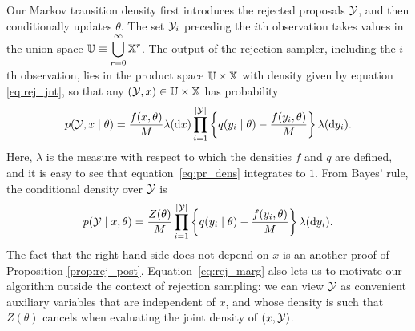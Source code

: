 Our Markov transition density first introduces the rejected proposals $\mathcal{Y}$, and then conditionally
updates $\theta$. The set $\mathcal{Y}_i$ preceding the $i$th observation takes values in the union space 
$\displaystyle \mathbb{U} \equiv \bigcup_{r=0}^{\infty} \mathbb{X}^r$. %
The output of the rejection sampler, including the $i$th observation, lies in the product space $\mathbb{U} \times \mathbb{X}$ with density given by equation \eqref{eq:rej_jnt},
so that any $(\mathcal{Y}, x) \in \mathbb{U} \times \mathbb{X}$ has probability
\begin{align}
  p(\cY,  x\mid\theta) = \frac{f(x, \theta)}{M}  \lambda(\mathrm{d}x) \prod_{i=1}^{|\mathcal{Y}|}  \left\{q(y_i\mid\theta) - \frac{ f(y_i, \theta)}{M} \right\} \lambda(\mathrm{d}y_i). \label{eq:pr_dens}
\end{align}
Here, $\lambda$ is the measure with respect to which the densities $f$ and $q$ are defined, and it is easy to see that 
equation~\eqref{eq:pr_dens} integrates to $1$. From Bayes' rule, the conditional density over $\mathcal{Y}$ is 
\begin{align}
  p(\cY \mid x, \theta) = \frac{Z(\theta)}{M}  \prod_{i=1}^{|\mathcal{Y}|}  \left\{q(y_i\mid\theta) - \frac{ f(y_i, \theta)}{M} \right\} \lambda(\mathrm{d}y_i). \label{eq:rej_marg}
\end{align}
The fact that the right-hand side does not depend on $x$ is an another proof of Proposition \ref{prop:rej_post}.
Equation~\eqref{eq:rej_marg} also lets us to motivate our algorithm 
outside the context of rejection sampling: we 
can view $\mathcal{Y}$ as convenient auxiliary variables that are independent of
$x$, and whose density is such that 
$Z(\theta)$ cancels when evaluating the joint density of $(x,\mathcal{Y})$.

